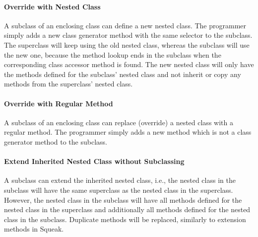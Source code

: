 \paragraph{Override with Nested Class}
A subclass of an enclosing class can define a new nested class. The programmer simply adds a new class generator method with the same selector to the subclass. The superclass will keep using the old nested class, whereas the subclass will use the new one, because the method lookup ends in the subclass when the corresponding class accessor method is found. The new nested class will only have the methods defined for the subclass' nested class and not inherit or copy any methods from the superclass' nested class.

\paragraph{Override with Regular Method}
A subclass of an enclosing class can replace (override) a nested class with a regular method. The programmer simply adds a new method which is not a class generator method to the subclass.

\paragraph{Extend Inherited Nested Class without Subclassing}
A subclass can extend the inherited nested class, i.e., the nested class in the subclass will have the same superclass as the nested class in the superclass. However, the nested class in the subclass will have all methods defined for the nested class in the superclass and additionally all methods defined for the nested class in the subclass. Duplicate methods will be replaced, similarly to extension methods in Squeak.


